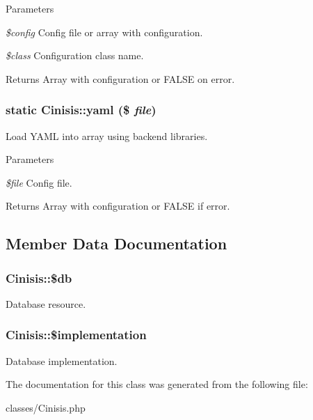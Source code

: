 \begin{DoxyParams}{Parameters}
\item[{\em \$config}]Config file or array with configuration.\item[{\em \$class}]Configuration class name.\end{DoxyParams}
\begin{DoxyReturn}{Returns}
Array with configuration or FALSE on error. 
\end{DoxyReturn}
\hypertarget{classCinisis_add6ffac62cffb6ba5e5b0bec552b2cee}{
\subsubsection[{yaml}]{\setlength{\rightskip}{0pt plus 5cm}static Cinisis::yaml (\$ {\em file})}}
\label{classCinisis_add6ffac62cffb6ba5e5b0bec552b2cee}
Load YAML into array using backend libraries.


\begin{DoxyParams}{Parameters}
\item[{\em \$file}]Config file.\end{DoxyParams}
\begin{DoxyReturn}{Returns}
Array with configuration or FALSE if error. 
\end{DoxyReturn}


\subsection{Member Data Documentation}
\hypertarget{classCinisis_ae8aedec88384439c95da89f423a219c0}{
\subsubsection[{\$db}]{\setlength{\rightskip}{0pt plus 5cm}Cinisis::\$db}}
\label{classCinisis_ae8aedec88384439c95da89f423a219c0}
Database resource. \hypertarget{classCinisis_ae537c5305e84e86ae7dd305d2cd253fc}{
\subsubsection[{\$implementation}]{\setlength{\rightskip}{0pt plus 5cm}Cinisis::\$implementation}}
\label{classCinisis_ae537c5305e84e86ae7dd305d2cd253fc}
Database implementation. 

The documentation for this class was generated from the following file:\begin{DoxyCompactItemize}
\item 
classes/Cinisis.php\end{DoxyCompactItemize}
